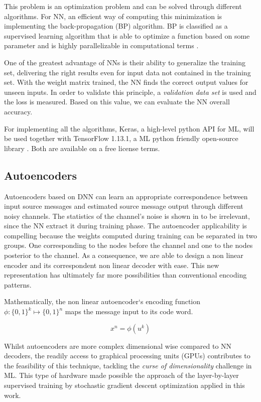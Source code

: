 \documentclass[conference]{IEEEtran}
\begin{document}
This problem is an optimization problem and can be solved through different algorithms. For NN, an efficient way of computing this minimization is implementing the back-propagation (BP) algorithm. 	BP is classified as a supervised learning algorithm that is able to optimize a function based on some parameter and is highly parallelizable in computational terms \cite{Ibnkahla}\cite{nielsenneural}.

One of the greatest advantage of NNs is their ability to generalize the training set, delivering the right results even for input data not contained in the training set. With the weight matrix trained, the NN finds the correct output values for unseen inputs. In order to validate this principle, a \textit{validation data set} is used and the loss is measured. Based on this value, we can evaluate the NN overall accuracy.

For implementing all the algorithms, Keras, a high-level python API for ML, will be used together with TensorFlow 1.13.1, a ML python friendly open-source library \cite{DBLP:journals/corr/AbadiABBCCCDDDG16} \cite{chollet2015keras}. Both are available on a free license terms.


\subsection{Autoencoders}

Autoencoders based on DNN can learn an appropriate correspondence between input source messages and estimated source message output through different noisy channels. The statistics of the channel's noise is shown in \cite{2017arXiv171008379G} to be irrelevant, since the NN extract it during training phase. The autoencoder applicability is compelling because the weights computed during training can be separated in two groups. One corresponding to the nodes before the channel and one to the nodes posterior to the channel. As a consequence, we are able to design a non linear encoder and its correspondent non linear decoder with ease. This new representation has ultimately far more possibilities than conventional encoding patterns.

Mathematically, the non linear autoencoder`s encoding function $\phi: \{0,1\}^k \mapsto \{0,1\}^n $ maps the message input to its code word. 

\begin{equation}
x^n = \phi (u^k)
\end{equation} 

Whilst autoencoders are more complex dimensional wise compared to NN decoders, the readily access to graphical processing units (GPUs) contributes to the feasibility of this technique, tackling the \textit{curse of dimensionality} challenge in ML. This type of hardware made possible the approach of the layer-by-layer supervised training by stochastic gradient descent optimization applied in this work. \cite{doi:10.1162/neco.2006.18.7.1527}
\end{document}
